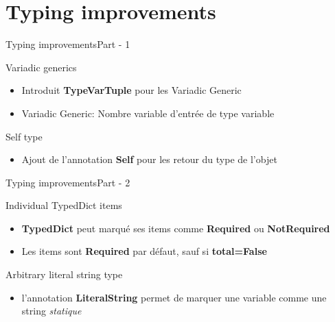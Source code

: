 \documentclass[aspectratio=169, xetex, 12pt]{beamer}
\begin{document}
    \section{Typing improvements}
    \begin{frame}{Typing improvements}{Part - 1}
        \begin{block}{Variadic generics}
            \begin{itemize}
                \item Introduit \textbf{TypeVarTuple} pour les Variadic Generic
                \item Variadic Generic: Nombre variable d'entrée de type variable
            \end{itemize}
        \end{block}
        \begin{block}{Self type}
            \begin{itemize}
                \item Ajout de l'annotation \textbf{Self} pour les retour du type de l'objet
            \end{itemize}
        \end{block}
    \end{frame}
    \begin{frame}{Typing improvements}{Part - 2}
        \begin{block}{Individual TypedDict items}
            \begin{itemize}
                \item \textbf{TypedDict} peut marqué ses items comme \textbf{Required} ou \textbf{NotRequired}
                \item Les items sont \textbf{Required} par défaut, sauf si \textbf{total=False}
            \end{itemize}
        \end{block}
        \begin{block}{Arbitrary literal string type}
            \begin{itemize}
                \item l'annotation \textbf{LiteralString} permet de marquer une variable comme une string \textit{statique}
            \end{itemize}
        \end{block}
    \end{frame}
\end{document}
